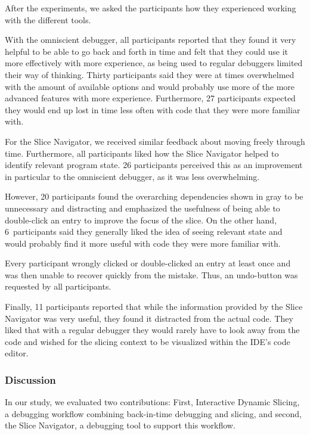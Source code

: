 \documentclass[
			english,
			]{elsarticle}
\begin{document}
After the experiments, we asked the participants how they experienced working with the different tools.

With the omniscient debugger, all participants reported that they found it very helpful to be able to go back and forth in time and felt that they could use it more effectively with more experience, as being used to regular debuggers limited their way of thinking.
Thirty participants said they were at times overwhelmed with the amount of available options and would probably use more of the more advanced features with more experience.
Furthermore, 27 participants expected they would end up lost in time less often with code that they were more familiar with.

For the Slice Navigator, we received similar feedback about moving freely through time.
Furthermore, all participants liked how the Slice Navigator helped to identify relevant program state.
26 participants perceived this as an improvement in particular to the omniscient debugger, as it was less overwhelming.

However, 20 participants found the overarching dependencies shown in gray to be unnecessary and distracting and emphasized the usefulness of being able to double-click an entry to improve the focus of the slice.
On the other hand, 6~participants said they generally liked the idea of seeing relevant state and would probably find it more useful with code they were more familiar with.

Every participant wrongly clicked or double-clicked an entry at least once and was then unable to recover quickly from the mistake.
Thus, an undo-button was requested by all participants.

Finally, 11 participants reported that while the information provided by the Slice Navigator was very useful, they found it distracted from the actual code.
They liked that with a regular debugger they would rarely have to look away from the code and wished for the slicing context to be visualized within the IDE's code editor.

\subsubsection{Discussion}

In our study, we evaluated two contributions: 
First, Interactive Dynamic Slicing, a debugging workflow combining back-in-time debugging and slicing, and second, the Slice Navigator, a debugging tool to support this workflow.
\end{document}
